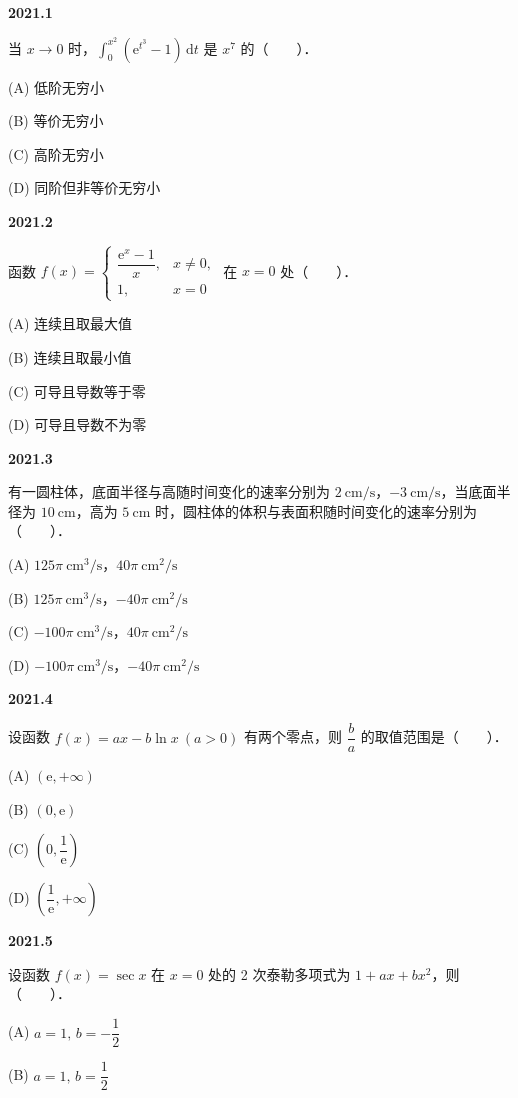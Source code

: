 \documentclass[UTF8,12pt,fontset=windows]{ctexart}
\begin{document}
{\large\bfseries 2021.1}

当 $x \to 0$ 时，$\displaystyle\int_{0}^{x^2} (\mathrm{e}^{t^3} - 1)\,\mathrm{d}t$ 是 $x^7$ 的（　　）．

(A) 低阶无穷小

(B) 等价无穷小

(C) 高阶无穷小

(D) 同阶但非等价无穷小

\vfill
\newpage
{\large\bfseries 2021.2}

函数 $f(x) = \begin{cases} \dfrac{\mathrm{e}^x - 1}{x}, & x \neq 0, \\ 1, & x = 0 \end{cases}$ 在 $x = 0$ 处（　　）．

(A) 连续且取最大值

(B) 连续且取最小值

(C) 可导且导数等于零

(D) 可导且导数不为零

\vfill
\newpage
{\large\bfseries 2021.3}

有一圆柱体，底面半径与高随时间变化的速率分别为 $2\ \mathrm{cm/s}$，$-3\ \mathrm{cm/s}$，当底面半径为 $10\ \mathrm{cm}$，高为 $5\ \mathrm{cm}$ 时，圆柱体的体积与表面积随时间变化的速率分别为（　　）．

(A) $125\pi\ \mathrm{cm^3/s}$，$40\pi\ \mathrm{cm^2/s}$

(B) $125\pi\ \mathrm{cm^3/s}$，$-40\pi\ \mathrm{cm^2/s}$

(C) $-100\pi\ \mathrm{cm^3/s}$，$40\pi\ \mathrm{cm^2/s}$

(D) $-100\pi\ \mathrm{cm^3/s}$，$-40\pi\ \mathrm{cm^2/s}$

\vfill
\newpage
{\large\bfseries 2021.4}

设函数 $f(x) = ax - b\ln x\ (a > 0)$ 有两个零点，则 $\dfrac{b}{a}$ 的取值范围是（　　）．

(A) $(\mathrm{e}, +\infty)$

(B) $(0, \mathrm{e})$

(C) $\left(0, \dfrac{1}{\mathrm{e}}\right)$

(D) $\left(\dfrac{1}{\mathrm{e}}, +\infty\right)$

\vfill
\newpage
{\large\bfseries 2021.5}

设函数 $f(x) = \sec x$ 在 $x = 0$ 处的 2 次泰勒多项式为 $1 + ax + bx^2$，则（　　）．

(A) $a = 1,\, b = -\dfrac{1}{2}$

(B) $a = 1,\, b = \dfrac{1}{2}$
\end{document}

